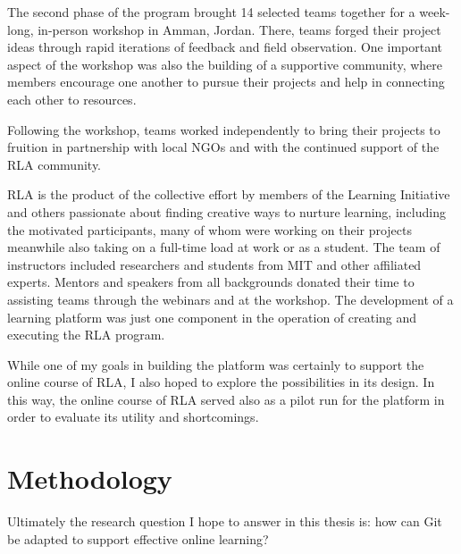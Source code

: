 \documentclass[12pt,twoside,vi]{mitthesis}
\begin{document}
The second phase of the program brought 14 selected teams together for a week-long, in-person workshop in Amman, Jordan. There, teams forged their project ideas through rapid iterations of feedback and field observation. One important aspect of the workshop was also the building of a supportive community, where members encourage one another to pursue their projects and help in connecting each other to resources.

Following the workshop, teams worked independently to bring their projects to fruition in partnership with local NGOs and with the continued support of the RLA community.~\cite{rla}

RLA is the product of the collective effort by members of the Learning Initiative and others passionate about finding creative ways to nurture learning, including the motivated participants, many of whom were working on their projects meanwhile also taking on a full-time load at work or as a student. The team of instructors included researchers and students from MIT and other affiliated experts. Mentors and speakers from all backgrounds donated their time to assisting teams through the webinars and at the workshop. The development of a learning platform was just one component in the operation of creating and executing the RLA program. 

While one of my goals in building the platform was certainly to support the online course of RLA, I also hoped to explore the possibilities in its design. In this way, the online course of RLA served also as a pilot run for the platform in order to evaluate its utility and shortcomings. 

\section{Methodology}

Ultimately the research question I hope to answer in this thesis is: how can Git be adapted to support effective online learning?
\end{document}
